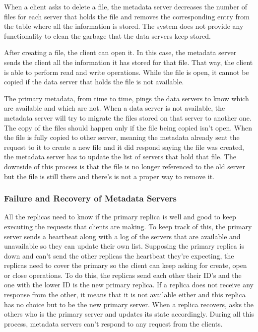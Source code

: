 When a client asks to delete a file, the metadata server decreases the
number of files for each server that holds the file and removes the 
corresponding entry from the table where all the information is stored. 
The system does not provide any functionality to clean the garbage that 
the data servers keep stored.

After creating a file, the client can open it. In this case, the metadata 
server sends the client all the information it has stored for that file. 
That way, the client is able to perform read and write operations. While 
the file is open, it cannot be copied if the data server that holds the 
file is not available.

The primary metadata, from time to time, pings the data servers to know 
which are available and which are not. When a data server is not 
available, the metadata server will try to migrate the files stored on 
that server to another one. The copy of the files should happen only if 
the file being copied isn't open. When the file is fully copied to other 
server, meaning the metadata already sent the request to it to create a 
new file and it did respond saying the file was created, the metadata 
server has to update the list of servers that hold that file. The downside 
of this process is that the file is no longer referenced to the 
old server but the file is still there and there's is not a proper way 
to remove it.

\subsubsection{Failure and Recovery of Metadata Servers}

All the replicas need to know if the primary replica is well and good to 
keep executing the requests that clients are making. To keep track of this, 
the primary server sends a heartbeat along with a log of the servers that 
are available and unavailable so they can update their own list. Supposing 
the primary replica is down and can't send the other replicas the heartbeat 
they're expecting, the replicas need to cover the primary so the client can 
keep asking for create, open or close operations. To do this, the replicas 
send each other their ID's and the one with the lower ID is the new primary
replica. If a replica does not receive any response from the other, it 
means that it is not available either and this replica has no choice but to 
be the new primary server. When a replica recovers, asks the others who is 
the primary server and updates its state accordingly. During all this process, 
metadata servers can't respond to any request from the clients.